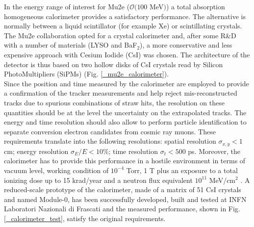 \documentclass[12pt,a4paper,openright, oneside, titlepage]{book} %
\begin{document}
\noindent
In the energy range of interest for Mu2e ($ \mathcal{O}(100$ MeV$)$) a total absorption homogeneous calorimeter provides a satisfactory performance. 
The alternative is normally between a liquid scintillator (for example Xe) or scintillating crystals. 
The Mu2e collaboration opted for a crystal calorimeter and, after some R\&D with a number of materials (LYSO and BaF$_2$), a more conservative and less expensive approach with Cesium Iodide (CsI) was chosen. 
The architecture of the detector is thus based on two hollow disks of CsI crystals read by Silicon PhotoMultipliers (SiPMs) (Fig. \ref{_mu2e_calorimeter}).\\ 
Since the position and time measured by the calorimeter are employed to provide a confirmation of the tracker measurements and help reject mis-reconstructed tracks due to spurious combinations of straw hits, the resolution on these quantities should be at the level the uncertainty on the extrapolated tracks. 
The energy and time resolution should also allow to perform particle identification to separate conversion electron candidates from cosmic ray muons. 
These requirements translate into the following resolutions: 
spatial resolution $\sigma_{x,y}<1$ cm; 
energy resolution $\sigma_E/E <10\%$; 
time resolution $\sigma_t < 500$ ps.
Moreover, the calorimeter has to provide this performance in a hostile environment in terms of vacuum level, working condition of $10^{-4}$ Torr, 1 T plus an exposure to a total ionizing dose up to 15 krad/year and a neutron flux equivalent $10^{11}$ MeV/cm$^2$ \cite{Donghia:2019}.
A reduced-scale prototype of the calorimeter, made of a matrix of 51 CsI crystals and named Module-0, has been successfully developed, built and tested at INFN Laboratori Nazionali di Frascati and the measured performance, shown in Fig. \ref{_calorimeter_test}, satisfy the original requirements.
\end{document}
